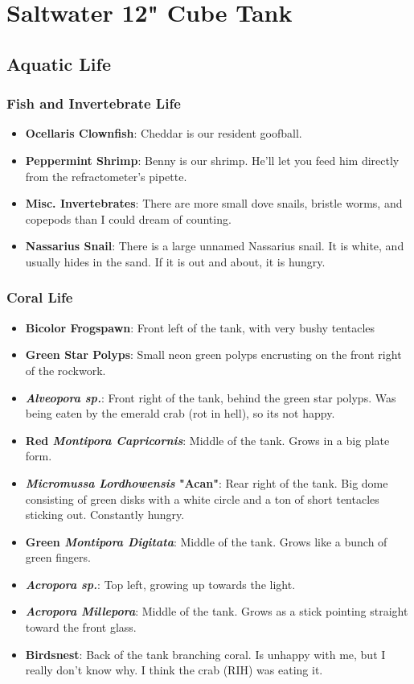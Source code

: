 \documentclass{report}
\begin{document}
\newpage
\chapter{Saltwater 12" Cube Tank}
\section{Aquatic Life}
\subsection{Fish and Invertebrate Life}
\begin{itemize}
    \item \textbf{Ocellaris Clownfish}: Cheddar is our resident goofball.
    \item \textbf{Peppermint Shrimp}: Benny is our shrimp. He'll let you feed him directly from the refractometer's pipette.
    \item \textbf{Misc. Invertebrates}: There are more small dove snails, bristle worms, and copepods than I could dream of 
    counting.
    \item \textbf{Nassarius Snail}: There is a large unnamed Nassarius snail. It is white, and usually hides in the sand. If it is out and about, it is 
    hungry.
\end{itemize}
\subsection{Coral Life}
\begin{itemize}
    \item \textbf{Bicolor Frogspawn}: Front left of the tank, with very bushy tentacles
    \item \textbf{Green Star Polyps}: Small neon green polyps encrusting on the front right of the rockwork. 
    \item \textbf{\textit{Alveopora sp.}}: Front right of the tank, behind the green star polyps. Was being eaten by the 
    emerald crab (rot in hell), so its not happy.
    \item \textbf{Red \textit{Montipora Capricornis}}: Middle of the tank. Grows in a big plate form.
    \item \textbf{\textit{Micromussa Lordhowensis} "Acan"}: Rear right of the tank. Big dome consisting of green disks with a 
    white circle and a ton of short tentacles sticking out. Constantly hungry. 
    \item \textbf{Green \textit{Montipora Digitata}}: Middle of the tank. Grows like a bunch of green fingers.
    \item \textbf{\textit{Acropora sp.}}: Top left, growing up towards the light.
    \item \textbf{\textit{Acropora Millepora}}: Middle of the tank. Grows as a stick pointing straight toward the front glass.
    \item \textbf{Birdsnest}: Back of the tank branching coral. Is unhappy with me, but I really don't know why. I think the 
    crab (RIH) was eating it. 
\end{itemize}
\end{document}

